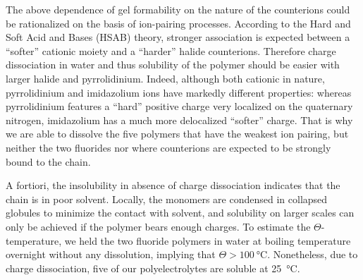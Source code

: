 \documentclass[journal=jacsat,manuscript=article]{achemso}
\begin{document}
The above dependence of gel formability on the nature of the counterions could be rationalized on the basis of ion-pairing processes. According to the Hard and Soft Acid and Bases (HSAB) theory, stronger association is expected between a ``softer'' cationic moiety and a ``harder'' halide counterions\cite{Goossens2009}. Therefore charge dissociation in water and thus solubility of the polymer should be easier with larger halide and pyrrolidinium. Indeed, although both cationic in nature, pyrrolidinium and imidazolium ions have markedly different properties: whereas pyrrolidinium features a ``hard'' positive charge very localized on the quaternary nitrogen, imidazolium has a much more delocalized ``softer'' charge. That is why we are able to dissolve the five polymers that have the weakest ion pairing, but neither the two fluorides nor  where counterions are expected to be strongly bound to the chain.

A fortiori, the insolubility in absence of charge dissociation indicates that the chain is in poor solvent. Locally, the monomers are condensed in collapsed globules to minimize the contact with solvent, and solubility on larger scales can only be achieved if the polymer bears enough charges\cite{Khokhlov1980,Raphael1990}. To estimate the $\Theta$-temperature, we held the two fluoride polymers in water at boiling temperature overnight without any dissolution, implying that $\Theta>\SI{100}{\celsius}$. Nonetheless, due to charge dissociation, five of our polyelectrolytes are soluble at \SI{25}{\celsius}.


\end{document}
